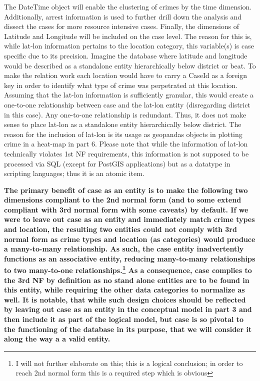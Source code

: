 \documentclass[a4paper]{article}
\begin{document}
The DateTime object will enable the clustering of crimes by the time dimension. Additionally, arrest information is used to further drill down the analysis and dissect the cases for more resource intensive cases. Finally, the dimensions of Latitude and Longitude will be included on the case level. The reason for this is, while lat-lon information pertains to the location category, this variable(s) is case specific due to its precision. Imagine the database where latitude and longitude would be described as a standalone entity hierarchically below district or beat. To make the relation work each location would have to carry a CaseId as a foreign key in order to identify what type of crime was perpetrated at this location. Assuming that the lat-lon information is sufficiently granular, this would create a one-to-one relationship between case and the lat-lon entity (disregarding district in this case). Any one-to-one relationship is redundant. Thus, it does not make sense to place lat-lon as a standalone entity hierarchically below district. The reason for the inclusion of lat-lon is its usage as geopandas objects in plotting crime in a heat-map in part 6. Please note that while the information of lat-lon technically violates 1st NF requirements, this information is not supposed to be processed via SQL (except for PostGIS applications) but as a datatype in scripting languages; thus it is an atomic item.

\textbf{The primary benefit of case as an entity is to make the following two dimensions compliant to the 2nd normal form (and to some extend compliant with 3rd normal form with some caveats) by default. If we were to leave out case as an entity and immediately match crime types and location, the resulting two entities could not comply with 3rd normal form as crime types and location (as categories) would produce a many-to-many relationship. As such, the case entity inadvertently functions as an associative entity, reducing many-to-many relationships to two many-to-one relationships.\footnote{I will not further elaborate on this; this is a logical conclusion; in order to reach 2nd normal form this is a required step which is obvious} As a consequence, case complies to the 3rd NF by definition as no stand alone entities are to be found in this entity, while requiring the other data categories to normalize as well. It is notable, that while such design choices should be reflected by leaving out case as an entity in the conceptual model in part 3 and then include it as part of the logical model, but case is so pivotal to the functioning of the database in its purpose, that we will consider it along the way a a valid entity.}
\end{document}
